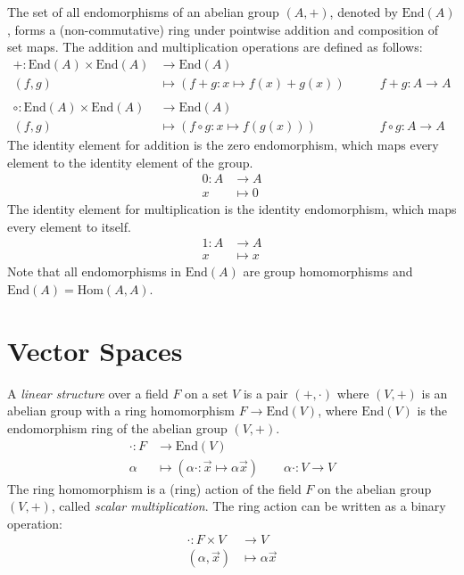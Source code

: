 \documentclass[
	11pt, %
	fleqn, %
	a4paper, %
]{LegrandOrangeBook}
\newcommand{\End}[1]{\text{End}(#1)} %
\newcommand{\Hom}[2]{\text{Hom}(#1, #2)} %
\begin{document}
\begin{definition}
    The set of all endomorphisms of an abelian group $(A, +)$, denoted by $\End{A}$, forms a (non-commutative) ring under pointwise addition and composition of set maps. The addition and multiplication operations are defined as follows:
    \[
        \begin{split}
            + : \End{A} \times \End{A} &\to \End{A} \\
            (f,g) &\mapsto (f+g: x \mapsto f(x) + g(x)) \qquad &f + g : A \to A \\ \\
            \circ : \End{A} \times \End{A} &\to \End{A} \\
            (f,g) &\mapsto (f \circ g: x \mapsto f(g(x))) \qquad &f \circ g : A \to A
        \end{split}
    \]
    The identity element for addition is the zero endomorphism, which maps every element to the identity element of the group. 
    \[ \begin{split}
        0: A &\to A \\
        x &\mapsto 0
    \end{split}
    \]
    The identity element for multiplication is the identity endomorphism, which maps every element to itself. 
    \[
    \begin{split}
        1: A &\to A \\
        x &\mapsto x
    \end{split}
    \]
    Note that all endomorphisms in $\End{A}$ are group homomorphisms and $\End{A} = \Hom{A}{A}$.
\end{definition}

\newpage

\section{Vector Spaces}

\begin{definition}
    A \emph{linear structure} over a field $F$ on a set $V$ is a pair $(+, \cdot)$ where $(V, +)$ is an abelian group with a ring homomorphism $F \to \End{V}$, where $\End{V}$ is the endomorphism ring of the abelian group $(V, +)$.
    \[ \begin{split}
            \cdot : F &\to \End{V} \\
            \alpha &\mapsto (\alpha\cdot : \vec{x} \mapsto \alpha \vec{x}) \qquad \alpha \cdot : V \to V
        \end{split}
    \]
    The ring homomorphism is a (ring) action of the field $F$ on the abelian group $(V, +)$, called \emph{scalar multiplication}. The ring action can be written as a binary operation:
    \[
        \begin{split}
            \cdot : F \times V &\to V \\
            (\alpha, \vec{x}) &\mapsto \alpha \vec{x}
        \end{split}
    \]
\end{definition}
\end{document}
